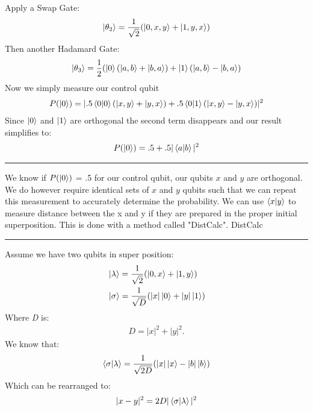 \documentclass[conference]{IEEEtran}
\begin{document}
   Apply a Swap Gate: \newline 
 \begin{align*} 
 \ket{\theta_2} = \frac{1}{\sqrt{2}}(\ket{0,x,y}+ \ket{1,y,x}) 
 \end{align*} 
   Then another Hadamard Gate: \newline 
 \begin{align*}
 \ket{\theta_3} = \frac{1}{2}(\ket{0}(\ket{a,b}+\ket{b,a}) + \ket{1}(\ket{a,b}-\ket{b,a}) 
 \end{align*} 
 Now we simply measure our control qubit \newline
 \begin{align*}
 P(\ket{0}) =|.5 \bra{0}\ket{0}(\ket{x,y} + \ket{y,x}) + .5\bra{0}\ket{1}(\ket{x,y}-\ket{y,x})|^2
 \end{align*}
 Since $\ket{0}$ and $\ket{1}$ are orthogonal the second term disappears and our result simplifies to: \newline
 \begin{align*}
 P(\ket{0}) = .5 + .5|\bra{a}\ket{b}|^2
 \end{align*} \newline
\noindent\rule{\columnwidth}{1pt}
\indent We know if $P(\ket{0})$ = .5 for our control qubit, our qubits $x$ and $y$ are orthogonal. We do however require identical sets of $x$ and $y$ qubits such that we can repeat this measurement to accurately determine the probability. We can use $\bra{x}\ket{y}$ to measure distance between the x and y if they are prepared in the proper initial superposition. This is done with a method called "DistCalc".  \newline
\newline
{\large DistCalc} \newline
\noindent\rule{\columnwidth}{1pt}
Assume we have two qubits in super position:
\begin{align*}
& \ket{\lambda} = \frac{1}{\sqrt{2}}(\ket{0,x} + \ket{1,y}) \\
& \ket{\sigma} = \frac{1}{\sqrt{D}}(|x|\ket{0} + |y|\ket{1})
\end{align*} 
Where \emph{D} is: 
\begin{align*}
D = |x|^2+|y|^2. 
\end{align*}  
We know that:  
\begin{align*}
 \bra{\sigma}\ket{\lambda} = \frac{1}{\sqrt{2D}}(|x|\ket{x} - |b|\ket{b})
\end{align*} 
Which can be rearranged to: 
\begin{align*}
|x-y|^2 = 2D|\bra{\sigma}\ket{\lambda}|^2
\end{align*} 
\end{document}
